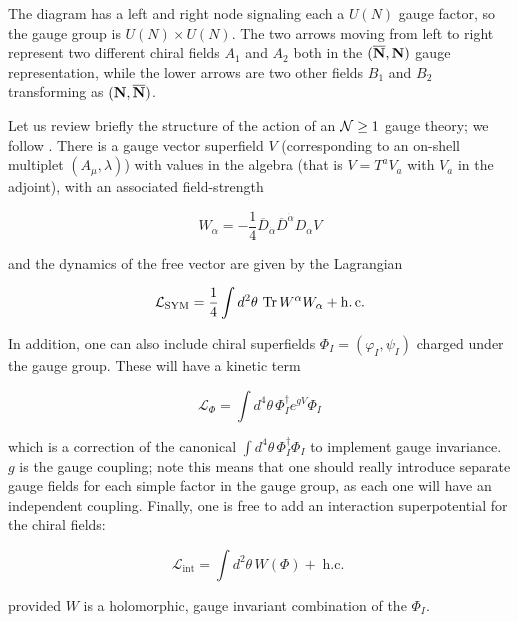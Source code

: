 The diagram has a left and right node signaling each a $U(N)$ gauge factor, so the gauge group is $U(N)\times U(N)$. The two arrows moving from left to right represent two different chiral fields $A_1$ and $A_2$ both in the $(\overline{\mathbf{N}},\mathbf{N})$ gauge representation, while the lower arrows are two other fields $B_1$ and $B_2$ transforming as $(\mathbf{N}, \overline{\mathbf{N}})$.

Let us review briefly the structure of the action of an $\mathcal{N} \geq 1$ gauge theory; we follow \cite{wessbagger}. There is a gauge vector superfield $V$ (corresponding to an on-shell multiplet $(A_\mu,\lambda)$) with values in the algebra (that is $V = T^a V_a$ with $V_a$ in the adjoint), with an associated field-strength

\begin{equation}
	W_\alpha = - \frac{1}{4} \overline{D}_{\dot \alpha} \overline{D}^{\dot \alpha} D_\alpha V
	\label{}
\end{equation}

and the dynamics of the free vector are given by the Lagrangian

\begin{equation}
	\mathcal{L}_\mathrm{SYM} = \frac{1}{4} \int d^2 \theta \,\operatorname{Tr} W^\alpha W_\alpha + \operatorname{h.c.}
	\label{kineticsym}
\end{equation}

In addition, one can also include chiral superfields $\Phi_I = (\varphi_I, \psi_I)$ charged under the gauge group. These will have a kinetic term

\begin{equation}
	\mathcal{L}_\Phi = \int d^4\theta\, \Phi^\dagger_I e^{gV} \Phi_I
	\label{}
\end{equation}

which is a correction of the canonical $\int d^4 \theta \, \Phi^\dagger_I \Phi_I$ to implement gauge invariance. $g$ is the gauge coupling; note this means that one should really introduce separate gauge fields for each simple factor in the gauge group, as each one will have an independent coupling. Finally, one is free to add an interaction superpotential for the chiral fields:

\begin{equation}
	\mathcal{L}_\mathrm{int} = \int d^2 \theta\, W(\Phi) + \operatorname{h.c.}
	\label{}
\end{equation}

provided $W$ is a holomorphic, gauge invariant combination of the $\Phi_I$.

